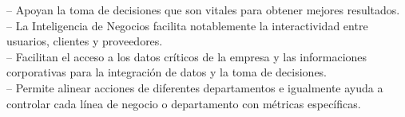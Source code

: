 \begin{flushleft}
 – Apoyan la toma de decisiones que son vitales para obtener mejores resultados.\textbf{}\\

 – La Inteligencia de Negocios facilita notablemente la interactividad entre usuarios, clientes y proveedores.\textbf{}\\

 – Facilitan el acceso a los datos críticos de la empresa y las informaciones corporativas para la integración de datos y la toma de decisiones.\textbf{}\\

 – Permite alinear acciones de diferentes departamentos e igualmente ayuda a controlar cada línea de negocio o departamento con métricas específicas.\textbf{}\\


\textbf{}\\
\textbf{}\\
\textbf{}\\
\textbf{}\\
\textbf{}\\

\textbf{}\\
\textbf{}\\
\end{flushleft}